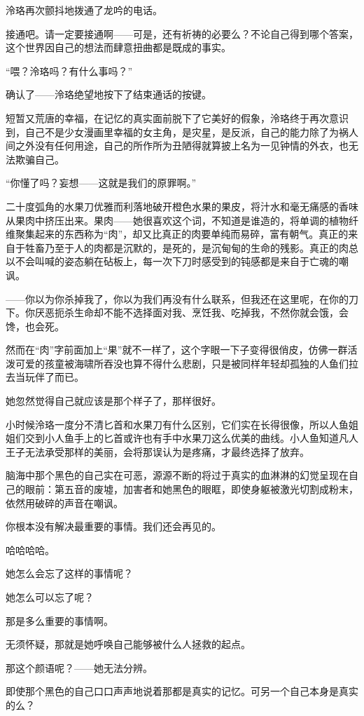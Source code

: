 \documentclass[UTF8, scheme = chinese, openany]{ctexbook}
\begin{document}
泠珞再次颤抖地拨通了龙吟的电话。

接通吧。请一定要接通啊——可是，还有祈祷的必要么？不论自己得到哪个答案，这个世界因自己的想法而肆意扭曲都是既成的事实。

“喂？泠珞吗？有什么事吗？”

确认了——泠珞绝望地按下了结束通话的按键。

短暂又荒唐的幸福，在记忆的真实面前脱下了它美好的假象，泠珞终于再次意识到，自己不是少女漫画里幸福的女主角，是灾星，是反派，自己的能力除了为祸人间之外没有任何用途，自己的所作所为丑陋得就算披上名为一见钟情的外衣，也无法欺骗自己。

“你懂了吗？妄想——这就是我们的原罪啊。”

二十度弧角的水果刀优雅而利落地破开橙色水果的果皮，将汁水和毫无痛感的香味从果肉中挤压出来。果肉——她很喜欢这个词，不知道是谁造的，将单调的植物纤维聚集起来的东西称为“肉”，却又比真正的肉要单纯而易碎，富有朝气。真正的来自于牲畜乃至于人的肉都是沉默的，是死的，是沉甸甸的生命的残影。真正的肉总以不会叫喊的姿态躺在砧板上，每一次下刀时感受到的钝感都是来自于亡魂的嘲讽。

——你以为你杀掉我了，你以为我们再没有什么联系，但我还在这里呢，在你的刀下。你厌恶扼杀生命却不能不选择面对我、烹饪我、吃掉我，不然你就会饿，会馋，也会死。

然而在“肉”字前面加上“果”就不一样了，这个字眼一下子变得很俏皮，仿佛一群活泼可爱的孩童被海啸所吞没也算不得什么悲剧，只是被同样年轻却孤独的人鱼们拉去当玩伴了而已。

她忽然觉得自己就应该是那个样子了，那样很好。

小时候泠珞一度分不清匕首和水果刀有什么区别，它们实在长得很像，所以人鱼姐姐们交到小人鱼手上的匕首或许也有手中水果刀这么优美的曲线。小人鱼知道凡人王子无法承受那样的美丽，会将那误认为是疼痛，才最终选择了放弃。

脑海中那个黑色的自己实在可恶，源源不断的将过于真实的血淋淋的幻觉呈现在自己的眼前：第五音的废墟，加害者和她黑色的眼眶，即使身躯被激光切割成粉末，依然用破碎的声音在嘲讽。

你根本没有解决最重要的事情。我们还会再见的。

哈哈哈哈。

她怎么会忘了这样的事情呢？

她怎么可以忘了呢？

那是多么重要的事情啊。

无须怀疑，那就是她呼唤自己能够被什么人拯救的起点。

那这个颜语呢？——她无法分辨。

即使那个黑色的自己口口声声地说着那都是真实的记忆。可另一个自己本身是真实的么？
\end{document}
